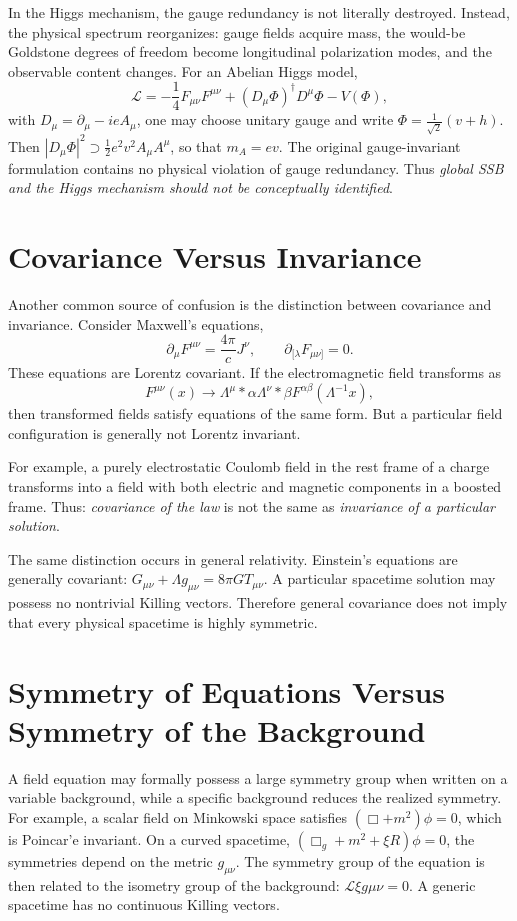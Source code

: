 In the Higgs mechanism, the gauge redundancy is not literally destroyed.
Instead, the physical spectrum reorganizes: gauge fields acquire mass, the
would-be Goldstone degrees of freedom become longitudinal polarization modes,
and the observable content changes.
For an Abelian Higgs model,
\[\mathcal{L}=-\frac14F_{\mu\nu}F^{\mu\nu}+(D_\mu\Phi)^\dagger D^\mu\Phi
-V(\Phi),\]
with $D_\mu=\partial_\mu-ieA_\mu$,
one may choose unitary gauge and write
$\Phi=\frac{1}{\sqrt2}(v+h)$. Then $|D_\mu\Phi|^2\supset
\frac12e^2v^2A_\mu A^\mu$,
so that $m_A=ev$.
The original gauge-invariant formulation contains no physical violation of gauge redundancy.
Thus \emph{global SSB and the Higgs mechanism should not be conceptually identified}.

\section{ Covariance Versus Invariance}
\label{sp:cvi}

Another common source of confusion is the distinction between covariance and invariance.
Consider Maxwell's equations,
\[\partial_\mu F^{\mu\nu}=\frac{4\pi}{c}J^\nu,
\qquad\partial_{[\lambda}F_{\mu\nu]}=0.
\]
These equations are Lorentz covariant.
If the electromagnetic field transforms as
\[F^{\mu\nu}(x)\rightarrow\Lambda^\mu{}*\alpha
\Lambda^\nu{}*\beta F^{\alpha\beta}(\Lambda^{-1}x),
\]
then transformed fields satisfy equations of the same form.
But a particular field configuration is generally not Lorentz invariant.

For example, a purely electrostatic Coulomb field in the rest frame of a charge
transforms into a field with both electric and magnetic components in a boosted
frame. Thus: \emph{covariance of the law} is not the same as \emph{invariance
of a particular solution}.

The same distinction occurs in general relativity.
Einstein's equations are generally covariant:
$G_{\mu\nu}+\Lambda g_{\mu\nu}=8\pi G T_{\mu\nu}$.
A particular spacetime solution may possess no nontrivial Killing vectors.
Therefore general covariance does not imply that every physical spacetime is
highly symmetric.

\section{Symmetry of Equations Versus Symmetry of the Background}
\label{sp:evb}

A field equation may formally possess a large symmetry group when written on a
variable background, while a specific background reduces the realized symmetry.
For example, a scalar field on Minkowski space satisfies
$(\Box+m^2)\phi=0$, which is Poincar'e invariant.
On a curved spacetime, $(\Box_g+m^2+\xi R)\phi=0$,
the symmetries depend on the metric $g_{\mu\nu}$.
The symmetry group of the equation is then related to the isometry group of the background:
$\mathcal{L} \xi g {\mu\nu}=0$.
A generic spacetime has no continuous Killing vectors.

